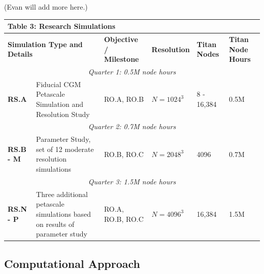 \documentclass[11pt,letterpaper,english]{article}
\begin{document}
(Evan will add more here.)



\begin{table}[h]
\vspace{-.12in}
\begin{tabular}{|l|p{2in}|p{1in}|p{0.7in}|p{0.5in}|p{0.7in}|} 
\multicolumn{6}{l}{\bf{Table 3: Research Simulations}}\\
\hline
\multicolumn{2}{|l|}{\bf Simulation Type and Details} & {\bf Objective / Milestone} & {\bf Resolution} & {\bf Titan Nodes} & {\bf Titan Node Hours} \\ \hline
\multicolumn{6}{|c|}{\it Quarter 1: 0.5M node hours} \\ \hline
\textbf{RS.A} & Fiducial CGM Petascale Simulation and Resolution Study & RO.A, RO.B & $N=1024^3$ & 8 - 16,384 & 0.5M\\ \hline
\multicolumn{6}{|c|}{\it Quarter 2: 0.7M node hours} \\ \hline
\textbf{RS.B - M} & Parameter Study, set of 12 moderate resolution simulations & RO.B, RO.C & $N=2048^3$ & 4096 & 0.7M\\ \hline
\multicolumn{6}{|c|}{\it Quarter 3: 1.5M node hours} \\ \hline
\textbf{RS.N - P} & Three additional petascale simulations based on results of parameter study & RO.A, RO.B, RO.C & $N=4096^3$ & 16,384 & 1.5M\\ \hline
\end{tabular}
\end{table}


\vspace{-.25in}
\subsection{Computational Approach}
\vspace{-.2in}


\end{document}
